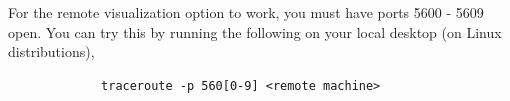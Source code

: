 \documentclass[12pt]{article}
\begin{document}





For the remote visualization option to work, you must have ports 5600
- 5609 open. You can try this by running the following on your local
desktop (on Linux distributions),

\begin{verbatim}        
             traceroute -p 560[0-9] <remote machine>
\end{verbatim}





\begin{figure}[h]
  \centering
  \vspace{5pt}
  \hspace{20pt}
  \qquad
  \caption{}
  \vspace{-10pt}
  \label{}
\end{figure}
\end{document}
